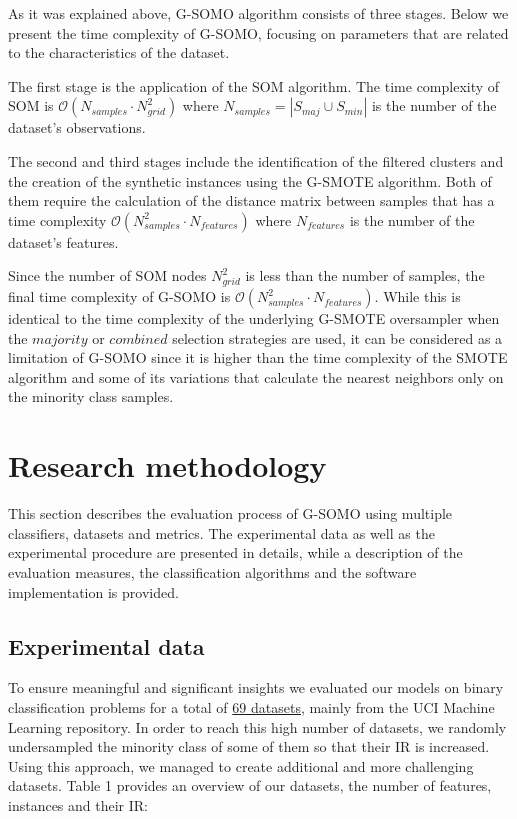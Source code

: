 \documentclass[parskip=full]{scrartcl}
\begin{document}
As it was explained above, G-SOMO algorithm consists of three stages. Below we present the time complexity of G-SOMO, focusing on parameters that are related to the characteristics of the dataset. 

The first stage is the application of the SOM algorithm.  The time complexity of SOM is \( \mathcal{O}(N_{samples} \cdot N_{grid}^2 ) \) where \( N_{samples} = |S_{maj} \cup S_{min}| \) is the number of the dataset's observations. 

The second and third stages include the identification of the filtered clusters and the creation of the synthetic instances using the G-SMOTE algorithm. Both of them require the calculation of the distance matrix between samples that has a time complexity \( \mathcal{O}(N_{samples}^2 \cdot N_{features}) \) where \( N_{features} \) is the number of the dataset's features.

Since the number of SOM nodes \( N_{grid}^2 \) is less than the number of samples, the final time complexity of G-SOMO is \( \mathcal{O}(N_{samples}^2 \cdot N_{features}) \). While this is identical to the time complexity of the underlying G-SMOTE oversampler when the $ majority $ or $ combined $ selection strategies are used, it can be considered as a limitation of G-SOMO since it is higher than the time complexity of the SMOTE algorithm and some of its variations that calculate the nearest neighbors only on the minority class samples.

\section{Research methodology}

This section describes the evaluation process of G-SOMO using multiple classifiers, datasets and metrics. The experimental data as well as the experimental procedure are presented in details, while a description of the evaluation measures, the classification algorithms and the software implementation is provided.

\subsection{Experimental data}

To ensure meaningful and significant insights we evaluated our models on binary classification problems for a total of \href{https://github.com/AlgoWit/publications/blob/master/gsomo/data/gsomo.db}{69 datasets}, mainly from the UCI Machine Learning repository. In order to reach this high number of datasets, we randomly undersampled the minority class of some of them so that their IR is increased. Using this approach, we managed to create additional and more challenging datasets. Table 1 provides an overview of our datasets, the number of features, instances and their IR:
\end{document}
